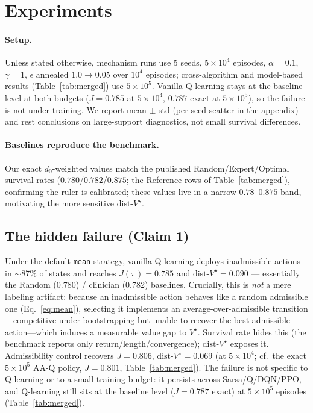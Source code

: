 \documentclass{article}
\newcommand{\dist}{\mathrm{dist}\text{-}V^\star}
\begin{document}
\section{Experiments}
\label{sec:experiments}
\paragraph{Setup.} Unless stated otherwise, mechanism runs use 5 seeds,
$5{\times}10^4$ episodes, $\alpha{=}0.1$, $\gamma{=}1$, $\epsilon$ annealed
$1.0{\to}0.05$ over $10^4$ episodes; cross-algorithm and model-based results
(Table~\ref{tab:merged}) use $5{\times}10^5$. Vanilla Q-learning stays at the
baseline level at both budgets ($J{=}0.785$ at $5{\times}10^4$, $0.787$ exact at
$5{\times}10^5$), so the failure is not under-training. We report mean $\pm$ std
(per-seed scatter in the appendix) and rest conclusions on large-support
diagnostics, not small survival differences.

\paragraph{Baselines reproduce the benchmark.}
Our exact $d_0$-weighted values match the published Random/Expert/Optimal survival
rates ($0.780$/$0.782$/$0.875$; the Reference rows of Table~\ref{tab:merged}),
confirming the ruler is calibrated; these values live in a narrow $0.78$--$0.875$
band, motivating the more sensitive $\dist$.

\subsection{The hidden failure (Claim 1)}
\label{sec:failure}
Under the default \texttt{mean} strategy, vanilla Q-learning deploys inadmissible
actions in $\sim$87\% of states and reaches $J(\pi){=}0.785$ and
$\dist{=}0.090$ --- essentially the Random (0.780) / clinician (0.782) baselines.
Crucially, this is \emph{not} a mere labeling artifact: because an inadmissible
action behaves like a random admissible one (Eq.~\eqref{eq:mean}), selecting it
implements an average-over-admissible transition---competitive under bootstrapping
but unable to recover the best admissible action---which induces a measurable value
gap to $V^\star$. Survival rate hides this (the benchmark reports only
return/length/convergence); $\dist$ exposes it. Admissibility control recovers
$J{=}0.806$, $\dist{=}0.069$ (at $5{\times}10^4$; cf.\ the exact $5{\times}10^5$ AA-Q policy, $J{=}0.801$, Table~\ref{tab:merged}). The failure is not specific to Q-learning or to a
small training budget: it persists across Sarsa/Q/DQN/PPO, and Q-learning still sits at the
baseline level ($J{=}0.787$ exact) at $5{\times}10^5$ episodes (Table~\ref{tab:merged}).
\end{document}
